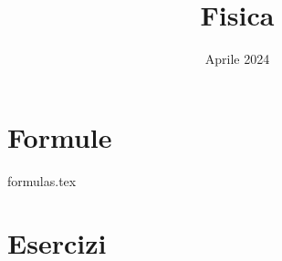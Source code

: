 \documentclass[a4paper,14pt]{extarticle}
\title{Fisica}
\author{}
\date{Aprile 2024}
\begin{document}
\maketitle
\tableofcontents
\newpage

\section{Formule}

 {formulas.tex}

\section{Esercizi}













\end{document}

